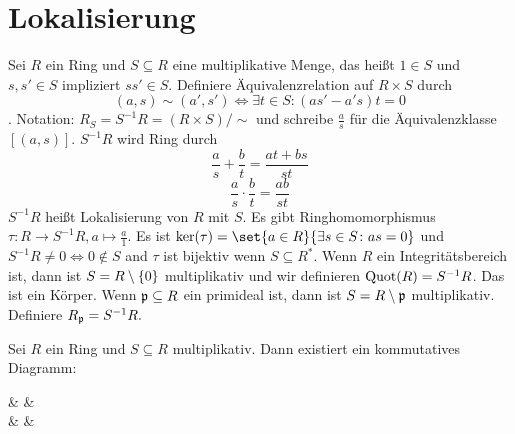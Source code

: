 \section{Lokalisierung}
\begin{Def}
	Sei \(R\) ein Ring und \(S\subseteq R\) eine multiplikative Menge, das heißt \(1\in S\) und \(s,s'\in S\) impliziert \(ss'\in S\).
	Definiere Äquivalenzrelation auf \(R\times S\) durch \[(a,s)\sim (a',s')\iff \exists t\in S\colon (as'-a's)t=0\]. Notation: \(R_S=S^{-1}R=(R\times S)/\sim\) und schreibe \(\frac a s\) für die Äquivalenzklasse \([(a,s)]\).
	\(S^{-1}R\) wird Ring durch 
	\[\frac a s+\frac b t=\frac{at+bs}{st}\]
	\[\frac a s\cdot \frac b t=\frac{ab}{st}\]
	\(S^{-1}R\) heißt Lokalisierung von \(R\) mit \(S\).
	Es gibt Ringhomomorphismus \(\tau:R\to S^{-1}R,a\mapsto \frac a 1\).
	Es ist \(\ker(\tau)=\set{ a\in R}{\exists s\in S\colon as=0}\) und \(S^{-1}R\neq 0 \iff 0\not\in S\) and \(\tau \) ist bijektiv wenn \(S\subseteq R^*\).
	Wenn \(R\) ein Integritätsbereich ist, dann ist \(S=R\setminus\{0\}\) multiplikativ und wir definieren \(\operatorname{Quot}(R)=S^{-1}R\). Das ist ein Körper.
	Wenn \(\mathfrak{p}\subseteq R\) ein primideal ist, dann ist \(S=R\setminus\mathfrak{p}\) multiplikativ. Definiere \(R_{\mathfrak{p}}=S^{-1}R.\)
\end{Def}
\begin{Satz}
	Sei \(R\) ein Ring und \(S\subseteq R\) multiplikativ. Dann existiert ein kommutatives Diagramm:
	\begin{tikzfigure}
		{}  &  &                    \\
		 \arrow[rr, "\sim"] \arrow[u, hook]             &  &  \arrow[u, hook]
	\end{tikzfigure}
\end{Satz}
